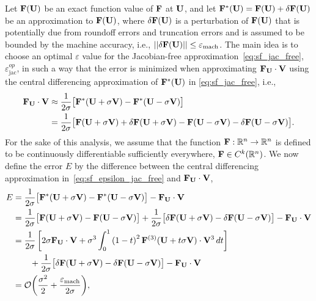 Let $\mathbf{F}(\mathbf{U})$ be an exact function value of $\mathbf{F}$ at $\mathbf{U}$, and let
$\mathbf{F}^{*}(\mathbf{U}) = \mathbf{F}(\mathbf{U}) + \delta \mathbf{F}(\mathbf{U})$ be
an approximation to $\mathbf{F}(\mathbf{U})$,
where $\delta \mathbf{F}(\mathbf{U})$ is a perturbation of
$\mathbf{F}(\mathbf{U})$ that is potentially due from roundoff errors and truncation errors
and is assumed to be bounded by the machine accuracy, i.e.,
$|| \delta\mathbf{F}(\mathbf{U}) || \le \varepsilon_{\text{mach}}$.
The main idea is to choose an optimal \( \varepsilon \) value
for the Jacobian-free approximation~\cref{eq:sf_jac_free},
$\varepsilon_{\text{jac}}^{op}$, in such a way that
the error is minimized
when approximating $\mathbf{F}_{\mathbf{U}} \cdot \mathbf{V}$ using
the central differencing approximation of $\mathbf{F}^{*}(\mathbf{U})$
in \cref{eq:sf_jac_free}, i.e.,
\begin{equation}\label{eq:sf_epsilon_jac_free}
    \begin{split}
        \mathbf{F}_{\mathbf{U}} \cdot \mathbf{V} &\approx \frac{1}{2 \sigma} \big[ \mathbf{F}^{*}(\mathbf{U} + \sigma \mathbf{V}) - \mathbf{F}^{*}(\mathbf{U} - \sigma \mathbf{V}) \big] \\
            & = \frac{1}{2 \sigma} \big[ \mathbf{F}(\mathbf{U} + \sigma \mathbf{V}) + \delta \mathbf{F}(\mathbf{U} + \sigma \mathbf{V})
            -\mathbf{F}(\mathbf{U} - \sigma \mathbf{V})  - \delta \mathbf{F}(\mathbf{U} - \sigma \mathbf{V}) \big].
    \end{split}
\end{equation}
For the sake of this analysis, we assume that the function
$\mathbf{F}:\mathbb{R}^n \to \mathbb{R}^n$ is defined to be continuously differentiable sufficiently everywhere,
 $\mathbf{F} \in C^k(\mathbb{R}^n)$.
We now define the error $E$ by the difference between the central differencing approximation 
in~\cref{eq:sf_epsilon_jac_free} and $\mathbf{F}_{\mathbf{U}} \cdot \mathbf{V}$,
\begin{equation} \label{eq:sf_epsilon_jac_free_error}
    \begin{split}
        E &= \frac{1}{2 \sigma} \big[ \mathbf{F}^{*}(\mathbf{U} + \sigma \mathbf{V}) - \mathbf{F}^{*}(\mathbf{U} - \sigma \mathbf{V}) \big]
            - \mathbf{F}_{\mathbf{U}} \cdot \mathbf{V} \\
          &= \frac{1}{2 \sigma} \big[ \mathbf{F}(\mathbf{U} + \sigma \mathbf{V}) - \mathbf{F}(\mathbf{U} - \sigma \mathbf{V}) \big] +
          \frac{1}{2 \sigma} \big[ \delta \mathbf{F}(\mathbf{U} + \sigma \mathbf{V}) - \delta \mathbf{F}(\mathbf{U} - \sigma \mathbf{V}) \big] -
            \mathbf{F}_{\mathbf{U}} \cdot \mathbf{V} \\
        &= \frac{1}{2 \sigma} \left[
            2 \sigma \mathbf{F}_{\mathbf{U}} \cdot \mathbf{V} +
            \sigma^{3} \int_{0}^{1} \left( 1 - t \right)^{2}  \mathbf{F}^{(3)} (\mathbf{U} + t \sigma \mathbf{V}) \cdot \mathbf{V}^{3} \mathop{dt}
        \right] \\
        &\qquad + \frac{1}{2 \sigma} \big[ \delta \mathbf{F}(\mathbf{U} + \sigma \mathbf{V}) - \delta \mathbf{F}(\mathbf{U} - \sigma \mathbf{V}) \big] -
            \mathbf{F}_{\mathbf{U}} \cdot \mathbf{V} \\
        &= \mathcal{O}\biggl(\frac{\sigma^2}{2} + \frac{\varepsilon_{\text{mach}}}{2\sigma} \biggr),
    \end{split}
\end{equation}
